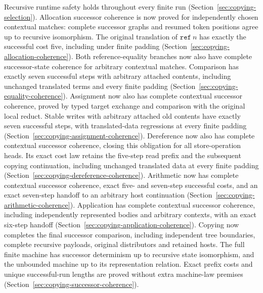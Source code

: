 Recursive runtime safety holds throughout every finite run
(Section~\ref{sec:copying-selection}). Allocation successor coherence is now
proved for independently chosen contextual matches: complete successor graphs
and resumed token positions agree up to recursive isomorphism. The original
translation of $\mathtt{ref}\ n$ has exactly the successful cost five, including
under finite padding (Section~\ref{sec:copying-allocation-coherence}). Both
reference-equality branches now also have complete successor-state coherence
for arbitrary contextual matches. Comparison has exactly seven successful
steps with arbitrary attached contents, including unchanged translated terms
and every finite padding (Section~\ref{sec:copying-equality-coherence}).
Assignment now also has complete contextual successor coherence, proved by
typed target exchange and comparison with the original local reduct. Stable
writes with arbitrary attached old contents have exactly seven successful
steps, with translated-data regressions at every finite padding
(Section~\ref{sec:copying-assignment-coherence}). Dereference now also has
complete contextual successor coherence, closing this obligation for all
store-operation heads. Its exact cost law retains the five-step read prefix
and the subsequent copying continuation, including unchanged translated data
at every finite padding (Section~\ref{sec:copying-dereference-coherence}).
Arithmetic now has complete contextual successor coherence, exact five- and
seven-step successful costs, and an exact seven-step handoff to an arbitrary
host continuation (Section~\ref{sec:copying-arithmetic-coherence}).
Application has complete contextual successor coherence, including
independently represented bodies and arbitrary contexts, with an exact six-step
handoff (Section~\ref{sec:copying-application-coherence}). Copying now completes
the final successor comparison, including independent tree boundaries, complete
recursive payloads, original distributors and retained hosts. The full finite
machine has successor determinism up to recursive state isomorphism, and the
unbounded machine up to its representation relation. Exact prefix costs and
unique successful-run lengths are proved without extra machine-law premises
(Section~\ref{sec:copying-successor-coherence}).

